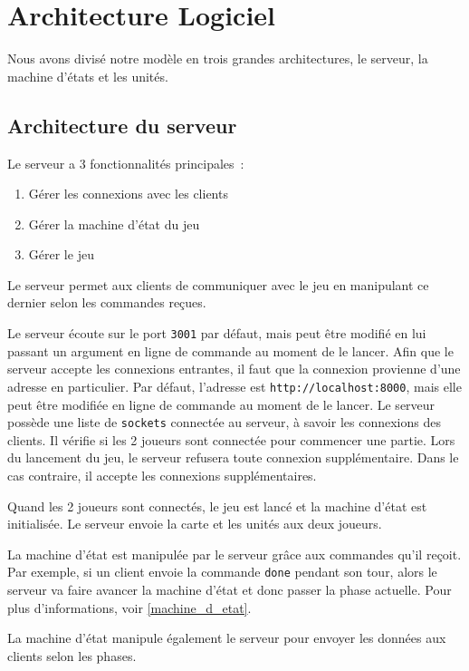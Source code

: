 
\section{Architecture Logiciel}

Nous avons divisé notre modèle en trois grandes architectures, le serveur, la machine d'états et les unités.

\subsection{Architecture du serveur}

Le serveur a 3 fonctionnalités principales :
\begin{enumerate}
    \item Gérer les connexions avec les clients
    \item Gérer la machine d'état du jeu
    \item Gérer le jeu
\end{enumerate}

Le serveur permet aux clients de communiquer avec le jeu en manipulant ce dernier selon les commandes reçues.

Le serveur écoute sur le port {\tt 3001} par défaut, mais peut être modifié en lui passant un argument en ligne de commande au moment de le lancer.
Afin que le serveur accepte les connexions entrantes, il faut que la connexion provienne d'une adresse en particulier. Par défaut, l'adresse est {\tt http://localhost:8000}, mais elle peut être modifiée en ligne de commande au moment de le lancer.
Le serveur possède une liste de {\tt sockets} connectée au serveur, à savoir les connexions des clients. Il vérifie si les 2 joueurs sont connectée pour commencer une partie. Lors du lancement du jeu, le serveur refusera toute connexion supplémentaire. Dans le cas contraire, il accepte les connexions supplémentaires.

Quand les 2 joueurs sont connectés, le jeu est lancé et la machine d'état est initialisée. Le serveur envoie la carte et les unités aux deux joueurs.

La machine d'état est manipulée par le serveur grâce aux commandes qu'il reçoit. Par exemple, si un client envoie la commande {\tt done} pendant son tour, alors le serveur va faire avancer la machine d'état et donc passer la phase actuelle.
Pour plus d'informations, voir \ref{machine_d_etat}.

La machine d'état manipule également le serveur pour envoyer les données aux clients selon les phases.

